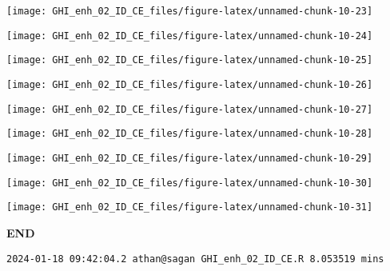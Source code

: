 \documentclass[
  10pt,
  a4paper,oneside]{article}
\begin{document}
\begin{center}\texttt{[image: GHI\_enh\_02\_ID\_CE\_files/figure-latex/unnamed-chunk-10-23]} \end{center}

\begin{center}\texttt{[image: GHI\_enh\_02\_ID\_CE\_files/figure-latex/unnamed-chunk-10-24]} \end{center}

\begin{center}\texttt{[image: GHI\_enh\_02\_ID\_CE\_files/figure-latex/unnamed-chunk-10-25]} \end{center}

\begin{center}\texttt{[image: GHI\_enh\_02\_ID\_CE\_files/figure-latex/unnamed-chunk-10-26]} \end{center}

\begin{center}\texttt{[image: GHI\_enh\_02\_ID\_CE\_files/figure-latex/unnamed-chunk-10-27]} \end{center}

\begin{center}\texttt{[image: GHI\_enh\_02\_ID\_CE\_files/figure-latex/unnamed-chunk-10-28]} \end{center}

\begin{center}\texttt{[image: GHI\_enh\_02\_ID\_CE\_files/figure-latex/unnamed-chunk-10-29]} \end{center}

\begin{center}\texttt{[image: GHI\_enh\_02\_ID\_CE\_files/figure-latex/unnamed-chunk-10-30]} \end{center}

\begin{center}\texttt{[image: GHI\_enh\_02\_ID\_CE\_files/figure-latex/unnamed-chunk-10-31]} \end{center}

\textbf{END}

\begin{verbatim}
2024-01-18 09:42:04.2 athan@sagan GHI_enh_02_ID_CE.R 8.053519 mins
\end{verbatim}
\end{document}

